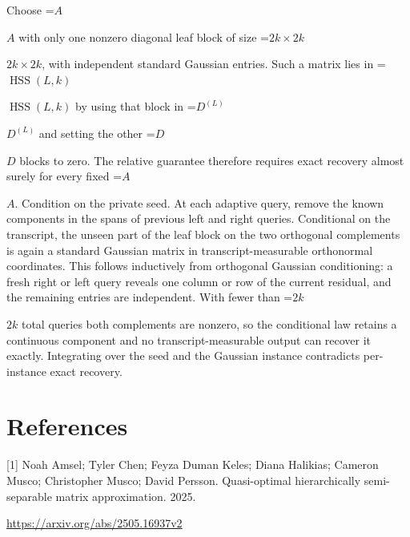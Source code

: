 \documentclass[10pt,a4paper]{article}
\newcommand{\AtlasMath}[1]{\par\begingroup\centering\setbox0=\hbox{$\displaystyle #1$}\ifdim\wd0>1.4\linewidth\typeout{ATLAS WIDE FORMULA: \the\wd0}\fi\ifdim\wd0>\linewidth\resizebox{\linewidth}{!}{\box0}\else\box0\fi\par\endgroup}
\newcommand{\AtlasInlineMath}[1]{\begingroup\setbox0=\hbox{$#1$}\ifdim\wd0>.4\linewidth\endgroup\AtlasMath{#1}\else\endgroup$#1$\fi}
\begin{document}
Choose \AtlasInlineMath{A} with only one nonzero diagonal leaf block of size \AtlasInlineMath{2k\times2k}, with independent standard Gaussian entries. Such a matrix lies in \AtlasInlineMath{\operatorname{HSS}(L,k)} by using that block in \AtlasInlineMath{D^{(L)}} and setting the other \AtlasInlineMath{D} blocks to zero. The relative guarantee therefore requires exact recovery almost surely for every fixed \AtlasInlineMath{A}. Condition on the private seed. At each adaptive query, remove the known components in the spans of previous left and right queries. Conditional on the transcript, the unseen part of the leaf block on the two orthogonal complements is again a standard Gaussian matrix in transcript-measurable orthonormal coordinates. This follows inductively from orthogonal Gaussian conditioning: a fresh right or left query reveals one column or row of the current residual, and the remaining entries are independent. With fewer than \AtlasInlineMath{2k} total queries both complements are nonzero, so the conditional law retains a continuous component and no transcript-measurable output can recover it exactly. Integrating over the seed and the Gaussian instance contradicts per-instance exact recovery.

\section{References}
[1] Noah Amsel; Tyler Chen; Feyza Duman Keles; Diana Halikias; Cameron Musco; Christopher Musco; David Persson. Quasi-optimal hierarchically semi-separable matrix approximation. 2025.

\url{https://arxiv.org/abs/2505.16937v2}
\end{document}
